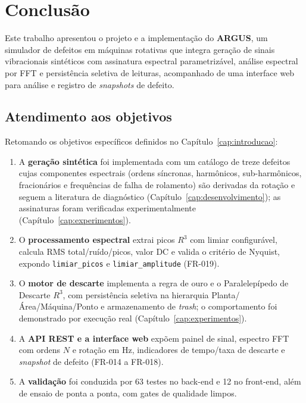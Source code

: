 \chapter{Conclusão}
\label{cap:conclusao}

Este trabalho apresentou o projeto e a implementação do \textbf{ARGUS}, um
simulador de defeitos em máquinas rotativas que integra geração de sinais
vibracionais sintéticos com assinatura espectral parametrizável, análise
espectral por FFT e persistência seletiva de leituras, acompanhado de uma
interface web para análise e registro de \emph{snapshots} de defeito.

\section{Atendimento aos objetivos}

Retomando os objetivos específicos definidos no
Capítulo~\ref{cap:introducao}:

\begin{enumerate}
  \item A \textbf{geração sintética} foi implementada com um catálogo de treze
  defeitos cujas componentes espectrais (ordens síncronas, harmônicos,
  sub-harmônicos, fracionários e frequências de falha de rolamento) são
  derivadas da rotação e seguem a literatura de diagnóstico
  (Capítulo~\ref{cap:desenvolvimento}); as assinaturas foram verificadas
  experimentalmente (Capítulo~\ref{cap:experimentos}).
  \item O \textbf{processamento espectral} extrai picos \(R^3\) com limiar
  configurável, calcula RMS total/ruído/picos, valor DC e valida o critério de
  Nyquist, expondo \texttt{limiar\_picos} e \texttt{limiar\_amplitude} (FR-019).
  \item O \textbf{motor de descarte} implementa a regra de ouro e o
  Paralelepípedo de Descarte \(R^3\), com persistência seletiva na hierarquia
  Planta/Área/Máquina/Ponto e armazenamento de \emph{trash}; o comportamento foi
  demonstrado por execução real (Capítulo~\ref{cap:experimentos}).
  \item A \textbf{API REST e a interface web} expõem painel de sinal, espectro
  FFT com ordens \(N\) e rotação em Hz, indicadores de tempo/taxa de descarte e
  \emph{snapshot} de defeito (FR-014 a FR-018).
  \item A \textbf{validação} foi conduzida por 63 testes no back-end e 12 no
  front-end, além de ensaio de ponta a ponta, com gates de qualidade limpos.
\end{enumerate}

